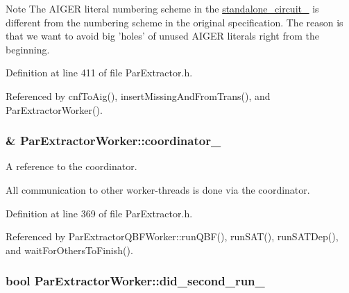 \begin{DoxyNote}{Note}
The A\-I\-G\-E\-R literal numbering scheme in the \hyperlink{classParExtractorWorker_a233a7f99946695b0640e76ead6932fbb}{standalone\-\_\-circuit\-\_\-} is different from the numbering scheme in the original specification. The reason is that we want to avoid big 'holes' of unused A\-I\-G\-E\-R literals right from the beginning. 
\end{DoxyNote}


Definition at line 411 of file Par\-Extractor.\-h.



Referenced by cnf\-To\-Aig(), insert\-Missing\-And\-From\-Trans(), and Par\-Extractor\-Worker().

\hypertarget{classParExtractorWorker_a749b01fd5ad1a57ae5793db2bb3b4e47}{
\subsubsection[{coordinator\-\_\-}]{\& Par\-Extractor\-Worker\-::coordinator\-\_\-\hspace{0.3cm}{\ttfamily [protected]}}}\label{classParExtractorWorker_a749b01fd5ad1a57ae5793db2bb3b4e47}


A reference to the coordinator. 

All communication to other worker-\/threads is done via the coordinator. 

Definition at line 369 of file Par\-Extractor.\-h.



Referenced by Par\-Extractor\-Q\-B\-F\-Worker\-::run\-Q\-B\-F(), run\-S\-A\-T(), run\-S\-A\-T\-Dep(), and wait\-For\-Others\-To\-Finish().

\hypertarget{classParExtractorWorker_a99552e89edf3a3925430399207a1b13e}{
\subsubsection[{did\-\_\-second\-\_\-run\-\_\-}]{\setlength{\rightskip}{0pt plus 5cm}bool Par\-Extractor\-Worker\-::did\-\_\-second\-\_\-run\-\_\-}}\label{classParExtractorWorker_a99552e89edf3a3925430399207a1b13e}


